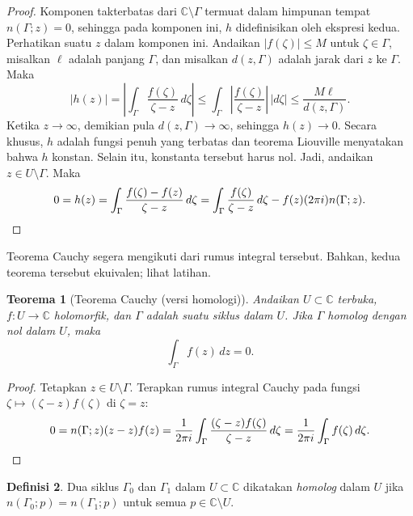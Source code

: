 \documentclass[12pt,openany]{book}
\newcommand{\sabs}[1]{\lvert {#1} \rvert}
\newcommand{\abs}[1]{\left\lvert {#1} \right\rvert}
\newcommand{\C}{{\mathbb{C}}}
\newcommand{\myindex}[1]{#1\index{#1}}
\theoremstyle{plain}
\newtheorem{thm}{Teorema}[section]
\theoremstyle{remark}
\theoremstyle{definition}
\newtheorem{defn}[thm]{Definisi}
\theoremstyle{exercise}
\theoremstyle{example}
\begin{document}
\begin{proof}
Komponen takterbatas dari $\C \setminus \Gamma$ termuat dalam
himpunan tempat $n(\Gamma;z) = 0$, sehingga pada komponen ini, $h$ didefinisikan oleh
ekspresi kedua.  Perhatikan suatu $z$ dalam komponen ini.
Andaikan $\sabs{f(\zeta)} \leq M$ untuk $\zeta \in \Gamma$, misalkan $\ell$ adalah panjang
$\Gamma$, dan misalkan $d(z,\Gamma)$ adalah jarak dari $z$ ke $\Gamma$.  Maka
\begin{equation*}
\sabs{h(z)}
=
\abs{
\int_\Gamma \frac{f(\zeta)}{\zeta-z} \, d\zeta
}
\leq
\int_\Gamma \abs{\frac{f(\zeta)}{\zeta-z}} \, \sabs{d\zeta}
\leq
\frac{M \ell}{d(z,\Gamma)} .
\end{equation*}
Ketika $z \to \infty$, demikian pula $d(z,\Gamma) \to \infty$, sehingga $h(z) \to 0$.
Secara khusus, $h$ adalah fungsi penuh yang terbatas dan
teorema Liouville menyatakan bahwa $h$ konstan. Selain itu, konstanta tersebut harus nol.
Jadi, andaikan $z \in U \setminus \Gamma$.  Maka
\begin{equation*}
0 = h(z) =
\int_\Gamma \frac{f(\zeta)-f(z)}{\zeta-z} \, d\zeta
=
\int_\Gamma \frac{f(\zeta)}{\zeta-z} \, d\zeta
-
f(z) (2\pi i) n(\Gamma;z) . \qedhere
\end{equation*}
\end{proof}

Teorema Cauchy segera mengikuti dari rumus integral tersebut.
Bahkan, kedua teorema tersebut ekuivalen; lihat latihan.

\begin{thm}[Teorema Cauchy (versi homologi)]
%
\label{thm:CThomology}%
Andaikan $U \subset \C$ terbuka,
$f \colon U \to \C$ holomorfik,
dan $\Gamma$ adalah
suatu siklus
dalam $U$.
Jika $\Gamma$
homolog dengan nol dalam $U$,
maka
\begin{equation*}
\int_\Gamma f(z) \, dz = 0 .
\end{equation*}
\end{thm}

\begin{proof}
Tetapkan $z \in U \setminus \Gamma$.  Terapkan 
rumus integral Cauchy pada fungsi $\zeta \mapsto
(\zeta-z)f(\zeta)$ di $\zeta=z$:
\begin{equation*}
0 = n(\Gamma;z) (z-z)f(z) =
\frac{1}{2\pi i} \int_\Gamma \frac{(\zeta-z)f(\zeta)}{\zeta-z} \, d\zeta
=
\frac{1}{2\pi i} \int_\Gamma f(\zeta) \, d\zeta . \qedhere
\end{equation*}
\end{proof}

\begin{defn}
Dua siklus
$\Gamma_0$ dan $\Gamma_1$ dalam $U
\subset \C$ dikatakan \emph{\myindex{homolog}} dalam $U$
jika $n(\Gamma_0;p) = n(\Gamma_1;p)$ untuk semua $p \in \C \setminus U$.
\end{defn}
\end{document}
